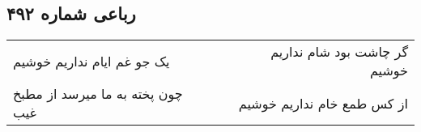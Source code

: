 \begin{center}
\section*{رباعی شماره ۴۹۲}
\label{sec:sh492}
\begin{longtable}{l p{0.5cm} r}
یک جو غم ایام نداریم خوشیم
&&
گر چاشت بود شام نداریم خوشیم
\\
چون پخته به ما میرسد از مطبخ غیب
&&
از کس طمع خام نداریم خوشیم
\\
\end{longtable}
\end{center}
